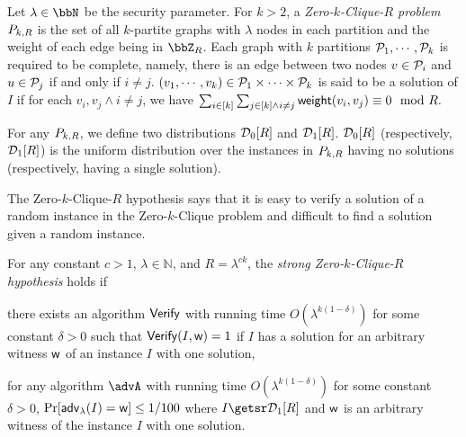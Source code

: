 \begin{definition}
Let $\lambda\in \N$ be the security parameter.
For $k>2$, a \emph{Zero-$k$-Clique-$R$ problem} $P_{k, R}$ is the set of all $k$-partite graphs with $\lambda$ nodes in each partition and the weight of each edge being in $\Z_{R}$. Each graph with $k$ partitions $\mathcal{P}_1, \cdots, \mathcal{P}_k$ is required to be complete, namely, there is an edge between two nodes $v \in \mathcal{P}_i$ and $u \in \mathcal{P}_j$ if and only if $i \neq j$. %
$(v_{1}, \cdots, v_{k}) \in \mathcal{P}_{1}\times\cdots\times\mathcal{P}_{k}$ is said to be a solution of $I$ if for each $v_i, v_j \land i \neq j$, we have
$\sum_{i \in [k]}\sum_{j\in[k] \land i \neq j}\mathsf{weight}(v_{i}, v_{j}) \equiv 0 \mod R.$

	For any $P_{k, R}$, we define two distributions $\mathcal{D}_0[R]$ and $\mathcal{D}_1[R]$. $\mathcal{D}_0[R]$ (respectively, $\mathcal{D}_1[R]$) is the uniform distribution over the instances in $P_{k, R}$ having no solutions (respectively, having a single solution).
	 \end{definition}

The Zero-$k$-Clique-$R$ hypothesis says that it is easy to verify a solution of a random instance in the Zero-$k$-Clique problem and difficult to find a solution given a random instance. 

\begin{definition}[Strong Zero-$k$-Clique-$R$ hypothesis and range $R = \lambda^{ck}$]
	For any constant $c > 1$, $\lambda \in \mathbb{N}$, and $R=\lambda^{ck}$, the \emph{strong Zero-$k$-Clique-$R$ hypothesis} holds if
	\begin{compactitem}
		\item there exists an algorithm $\mathsf{Verify}$ with running time $O(\lambda^{k(1-\delta)})$ for some constant $\delta > 0$ such that $\mathsf{Verify}(I, \mathsf{w}) = 1$ if $I$ has a solution for an arbitrary witness $\mathsf{w}$ of an instance $I$ with one solution,
		\item for any algorithm $\advA$ with running time $O(\lambda^{k(1-\delta)})$ for some constant $\delta > 0$,
			$ \Pr[{\mathsf{adv}}_\lambda(I) = \mathsf{w}] \leq 1/100$
			where $I \getsr \zkcdistone{R}$ and $\mathsf{w}$ is an arbitrary witness of the instance $I$ with one solution.
	\end{compactitem}
\end{definition}

